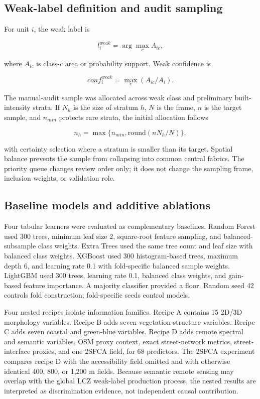 \subsection{Weak-label definition and audit sampling}

For unit $i$, the weak label is

\begin{equation}
l_i^{weak}=\arg\max_c A_{ic},
\end{equation}

where $A_{ic}$ is class-$c$ area or probability support. Weak confidence is

\begin{equation}
conf_i^{weak}=\max_c(A_{ic}/A_i).
\end{equation}

The manual-audit sample was allocated across weak class and preliminary
built-intensity strata. If $N_h$ is the size of stratum $h$, $N$ is the frame,
$n$ is the target sample, and $n_{min}$ protects rare strata, the initial
allocation follows

\begin{equation}
n_h=\max\{n_{min},\mathrm{round}(nN_h/N)\},
\end{equation}

with certainty selection where a stratum is smaller than its target. Spatial
balance prevents the sample from collapsing into common central fabrics. The
priority queue changes review order only; it does not change the sampling
frame, inclusion weights, or validation role.

\subsection{Baseline models and additive ablations}

Four tabular learners were evaluated as complementary baselines. Random Forest
used 300 trees, minimum leaf size 2, square-root feature sampling, and
balanced-subsample class weights. Extra Trees used the same tree count and leaf
size with balanced class weights. XGBoost used 300 histogram-based trees,
maximum depth 6, and learning rate 0.1 with fold-specific balanced sample
weights. LightGBM used 300 trees, learning rate 0.1, balanced class weights,
and gain-based feature importance. A majority classifier provided a floor.
Random seed 42 controls fold construction; fold-specific seeds control models.

Four nested recipes isolate information families. Recipe A contains 15 2D/3D
morphology variables. Recipe B adds seven vegetation-structure variables.
Recipe C adds seven coastal and green-blue variables. Recipe D adds remote
spectral and semantic variables, OSM proxy context, exact street-network
metrics, street-interface proxies, and one 2SFCA field, for 68 predictors. The
2SFCA experiment compares recipe D with the accessibility field omitted and
with otherwise identical 400, 800, or 1,200 m fields. Because semantic remote
sensing may overlap with the global LCZ weak-label production process, the
nested results are interpreted as discrimination evidence, not independent
causal contribution.

